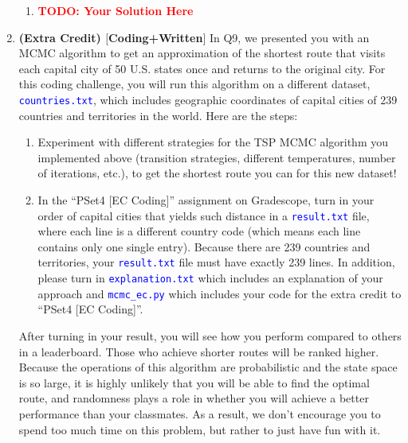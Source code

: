 \documentclass[12pt]{article}
\def\code#1{\textcolor{blue}{\texttt{#1}}}
\def\todo#1{\textcolor{red}{\textbf{#1}}}
\renewcommand{\|}{\mid}
\begin{document}
\begin{enumerate}
\begin{tcolorbox}
\begin{enumerate}
\item \todo{TODO: Your Solution Here}
\end{enumerate}
\end{tcolorbox}

\item \textbf{(Extra Credit) $[$Coding+Written$]$} In Q9, we presented you with an MCMC algorithm to get an approximation of the shortest route that visits each capital city of 50 U.S. states once and returns to the original city. For this coding challenge, you will run this algorithm on a different dataset, \code{countries.txt}, which includes geographic coordinates of capital cities of 239 countries and territories in the world. Here are the steps:

\begin{enumerate}[label=\Roman*.]
    \item Experiment with different strategies for the TSP MCMC algorithm you implemented above (transition strategies, different temperatures, number of iterations, etc.), to get the shortest route you can for this new dataset!
    \item In the ``PSet4 [EC Coding]'' assignment on Gradescope, turn in your order of capital cities that yields such distance in a \code{result.txt} file, where each line is a different country code (which means each line contains only one single entry). Because there are 239 countries and territories, your \code{result.txt} file must have exactly 239 lines.  In addition, please turn in \code{explanation.txt} which includes an explanation of your approach and \code{mcmc\_ec.py} which includes your code for the extra credit to ``PSet4 [EC Coding]''.
\end{enumerate}
After turning in your result, you will see how you perform compared to others in a leaderboard. Those who achieve shorter routes will be ranked higher. Because the operations of this algorithm are probabilistic and the state space is so large, it is highly unlikely that you will be able to find the optimal route, and randomness plays a role in whether you will achieve a better performance than your classmates. As a result, we don't encourage you to spend too much time on this problem, but rather to just have fun with it.

\end{enumerate}
\end{document}
